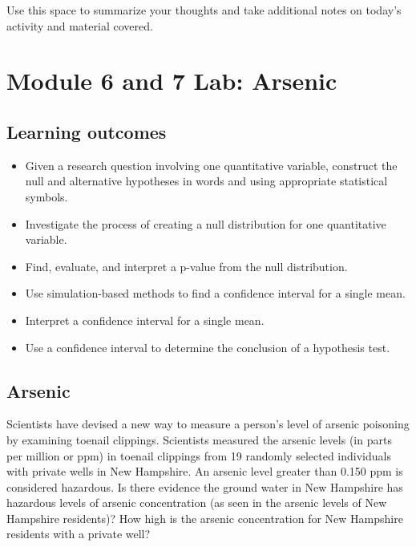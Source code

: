 \documentclass[
]{report}
\begin{document}
Use this space to summarize your thoughts and take additional notes on today's activity and material covered.

\newpage

\section{Module 6 and 7 Lab: Arsenic}\label{module-6-and-7-lab-arsenic}


\subsection{Learning outcomes}\label{learning-outcomes-16}

\begin{itemize}
\item
  Given a research question involving one quantitative variable, construct the null and alternative hypotheses
  in words and using appropriate statistical symbols.
\item
  Investigate the process of creating a null distribution for one quantitative variable.
\item
  Find, evaluate, and interpret a p-value from the null distribution.
\item
  Use simulation-based methods to find a confidence interval for a single mean.
\item
  Interpret a confidence interval for a single mean.
\item
  Use a confidence interval to determine the conclusion of a hypothesis test.
\end{itemize}

\subsection{Arsenic}\label{arsenic}

Scientists have devised a new way to measure a person's level of arsenic poisoning by examining toenail clippings. Scientists measured the arsenic levels (in parts per million or ppm) in toenail clippings from 19 randomly selected individuals with private wells in New Hampshire. An arsenic level greater than 0.150 ppm is considered hazardous. Is there evidence the ground water in New Hampshire has hazardous levels of arsenic concentration (as seen in the arsenic levels of New Hampshire residents)? How high is the arsenic concentration for New Hampshire residents with a private well?
\end{document}
